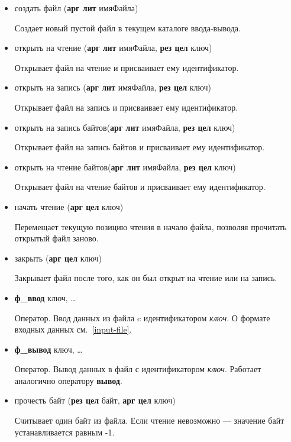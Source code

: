 \begin{itemize}
\item создать файл (\textbf{арг лит} имяФайла)

Создает новый пустой файл в текущем каталоге ввода-вывода.

\item открыть на чтение (\textbf{арг лит} имяФайла, \textbf{рез цел} ключ)

Открывает файл на чтение и присваивает ему идентификатор.

\item открыть на запись (\textbf{арг лит} имяФайла, \textbf{рез цел} ключ)

Открывает файл на запись и присваивает ему идентификатор.

\item открыть на запись байтов(\textbf{арг лит} имяФайла, \textbf{рез цел} ключ)

Открывает файл на запись байтов и присваивает ему идентификатор.

\item открыть на чтение байтов(\textbf{арг лит} имяФайла, \textbf{рез цел} ключ)

Открывает файл на чтение байтов и присваивает ему идентификатор.

\item начать чтение (\textbf{арг цел} ключ)

Перемещает текущую позицию чтения в начало файла, позволяя прочитать открытый файл заново.

\item закрыть (\textbf{арг цел} ключ)

Закрывает файл после того, как он был открыт на чтение или на запись.

\item \textbf{ф\_ввод} ключ, \dots

Оператор. Ввод данных из файла c идентификатором \emph{ключ}. О формате входных данных см.~\ref{input-file}.

\item \textbf{ф\_вывод} ключ, \dots

Оператор. Вывод данных в файл с идентификатором \emph{ключ}. Работает аналогично оператору \textbf{вывод}.

\item прочесть байт (\textbf{рез цел} байт, \textbf{арг цел} ключ)

Считывает один байт из файла. Если чтение невозможно --- значение \textsf{байт} устанавливается равным -1.


\end{itemize}
